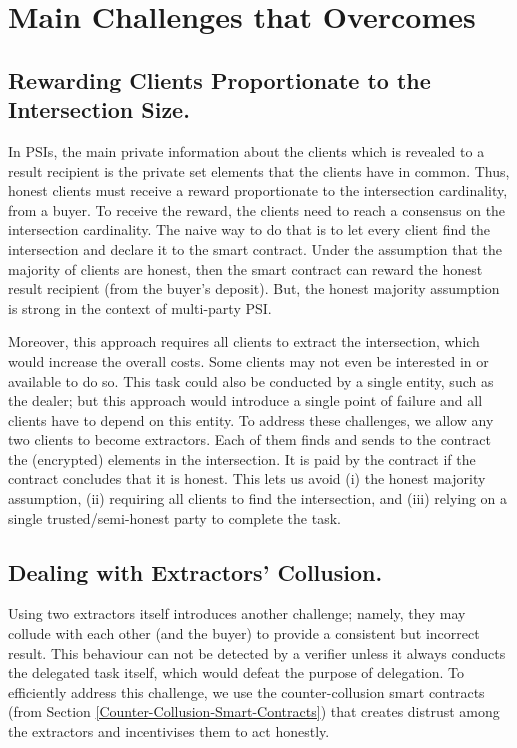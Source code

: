 




\section{Main Challenges that \withRew Overcomes}\label{sec::Annesidora-challenges}


\subsection{Rewarding Clients Proportionate to the Intersection Size.}
In PSIs, the main private information about the clients which is revealed to a result recipient is the private set elements that the clients have in common. Thus, honest clients must receive a reward proportionate to the intersection cardinality, from a buyer. To receive the reward, the clients need to reach a consensus on the intersection cardinality. The naive way to do that is to let every client find the intersection and declare it to the smart contract. Under the assumption that the majority of clients are honest, then the smart contract can reward the honest result recipient (from the buyer's deposit). But, the honest majority assumption is strong in the context of multi-party PSI. 

Moreover, this approach requires all clients to extract the intersection, which would increase the overall costs.  Some clients may not even be interested in or available to do so. This task could also be conducted by a single entity, such as the dealer; but this approach would introduce a single point of failure and all clients have to depend on this entity.  
%
To address these challenges, we allow any two clients to become extractors.  Each of them finds and sends to the contract the (encrypted) elements in the intersection. It is paid by the contract if the contract concludes that it is honest. This lets us avoid (i) the honest majority assumption, (ii) requiring all clients to find the intersection, and (iii) relying on a single trusted/semi-honest party to complete the task. 





 \vspace{-1mm}
\subsection{Dealing with Extractors' Collusion.}
%
Using two extractors itself introduces another challenge; namely, they may collude with each other (and the buyer) to provide a consistent but incorrect result. This behaviour can not be detected by a verifier unless it always conducts the delegated task itself, which would defeat the purpose of delegation. To efficiently address this challenge, we use the counter-collusion smart contracts (from Section \ref{Counter-Collusion-Smart-Contracts}) that creates distrust among the extractors and incentivises them to act honestly. 




 
